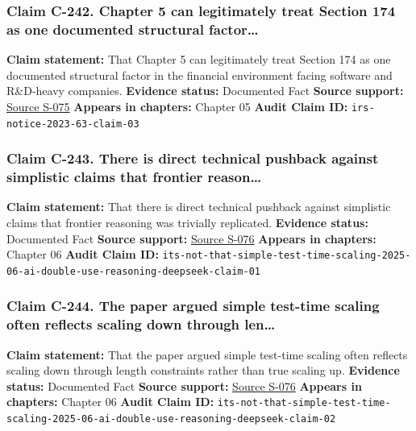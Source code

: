 \documentclass[
  american,
  11pt,
  letterpaper,
]{article}
\begin{document}
\subsubsection{Claim C-242. Chapter 5 can legitimately treat Section 174
as one documented structural
factor\ldots{}}\label{claim-c-242-chapter-5-can-legitimately-treat-section-174-as-one-documented-structural-factor}

\textbf{Claim statement:} That Chapter 5 can legitimately treat Section
174 as one documented structural factor in the financial environment
facing software and R\&D-heavy companies. \textbf{Evidence status:}
Documented Fact \textbf{Source support:}
\hyperref[source-s-075-notice-2023-63-guidance-on-section-174-and-specified-research-or-experimental-expenditures]{Source
S-075} \textbf{Appears in chapters:} Chapter 05 \textbf{Audit Claim ID:}
\texttt{irs-notice-2023-63-claim-03}

\subsubsection{Claim C-243. There is direct technical pushback against
simplistic claims that frontier
reason\ldots{}}\label{claim-c-243-there-is-direct-technical-pushback-against-simplistic-claims-that-frontier-reason}

\textbf{Claim statement:} That there is direct technical pushback
against simplistic claims that frontier reasoning was trivially
replicated. \textbf{Evidence status:} Documented Fact \textbf{Source
support:}
\hyperref[source-s-076-it-s-not-that-simple-an-analysis-of-simple-test-time-scaling]{Source
S-076} \textbf{Appears in chapters:} Chapter 06 \textbf{Audit Claim ID:}
\texttt{its-not-that-simple-test-time-scaling-2025-06-ai-double-use-reasoning-deepseek-claim-01}

\subsubsection{Claim C-244. The paper argued simple test-time scaling
often reflects scaling down through
len\ldots{}}\label{claim-c-244-the-paper-argued-simple-test-time-scaling-often-reflects-scaling-down-through-len}

\textbf{Claim statement:} That the paper argued simple test-time scaling
often reflects scaling down through length constraints rather than true
scaling up. \textbf{Evidence status:} Documented Fact \textbf{Source
support:}
\hyperref[source-s-076-it-s-not-that-simple-an-analysis-of-simple-test-time-scaling]{Source
S-076} \textbf{Appears in chapters:} Chapter 06 \textbf{Audit Claim ID:}
\texttt{its-not-that-simple-test-time-scaling-2025-06-ai-double-use-reasoning-deepseek-claim-02}
\end{document}
